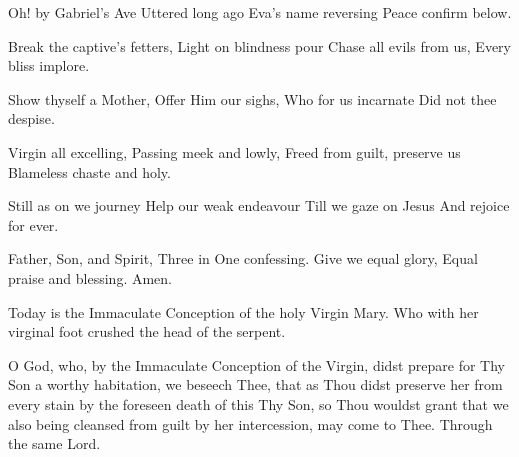 {{\item Oh! by Gabriel's Ave
Uttered long ago
Eva's name reversing
Peace confirm below.

\item Break the captive's fetters,
Light on blindness pour
Chase all evils from us,
Every bliss implore.

\item Show thyself a Mother,
Offer Him our sighs,
Who for us incarnate
Did not thee despise.

\item Virgin all excelling,
Passing meek and lowly,
Freed from guilt, preserve us
Blameless chaste and holy.

\item Still as on we journey
Help our weak endeavour
Till we gaze on Jesus
And rejoice for ever.

\item Father, Son, and Spirit,
Three in One confessing.
Give we equal glory,
Equal praise and blessing.
Amen.
}

{
\def\vrlinebreak{T}
{Today is the Immaculate Conception of the holy Virgin Mary.}
{Who with her virginal foot crushed the head of the serpent.}
}

\bigskip
{
\newcommand{\anttranslation}{This day a rod came forth from the root of Jesse: this day Mary was conceived without any stain of sin: this day the head of the old serpent was crushed by her.  Alleluia.}
\def\breakbeforeEuouae{T}
\def\noeuouae{T}
\def\preverses{\greblockcustos}
\def\dontrepeatantiphon{T}
}
{O God, who, by the Immaculate Conception of the Virgin, didst prepare for Thy Son a worthy habitation, we beseech Thee, that as Thou didst preserve her from every stain by the foreseen death of this Thy Son, so Thou wouldst grant that we also being cleansed from guilt by her intercession, may come to Thee.  Through the same Lord.}
\bigskip

\bigskip
\noindent
{}
\bigskip
}


